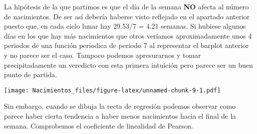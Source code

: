 \documentclass[
]{article}
\newenvironment{Shaded}{\begin{snugshade}}{\end{snugshade}}
\newcommand{\CommentTok}[1]{\textcolor[rgb]{0.56,0.35,0.01}{\textit{#1}}}
\newcommand{\DecValTok}[1]{\textcolor[rgb]{0.00,0.00,0.81}{#1}}
\newcommand{\FunctionTok}[1]{\textcolor[rgb]{0.00,0.00,0.00}{#1}}
\newcommand{\NormalTok}[1]{#1}
\newcommand{\OtherTok}[1]{\textcolor[rgb]{0.56,0.35,0.01}{#1}}
\newcommand{\SpecialCharTok}[1]{\textcolor[rgb]{0.00,0.00,0.00}{#1}}
\begin{document}
\begin{Shaded}
\end{Shaded}

La hipótesis de la que partimos es que el día de la semana \textbf{NO}
afecta al número de nacimientos. De ser así debería haberse visto
reflejado en el apartado anterior puesto que, en cada ciclo lunar hay
29.53/7 = 4.21 semanas. Si hubiese algunos días en los que hay más
nacimientos que otros veríamos aproximadamente unos 4 periodos de una
función periodica de periodo 7 al representar el barplot anterior y no
parece ser el caso. Tampoco podemos apresurarnos y tomar
precipitadamente un veredicto con esta primera intuición pero parece ser
un buen punto de partida.

\begin{Shaded}
\end{Shaded}

\texttt{[image: Nacimientos\_files/figure-latex/unnamed-chunk-9-1.pdf]}

Sin embargo, cuando se dibuja la recta de regresión podemos observar
como parece haber cierta tendencia a haber menos nacimientos hacia el
final de la semana. Comprobemos el coeficiente de linealidad de Pearson.

\begin{Shaded}
\end{Shaded}
\end{document}

